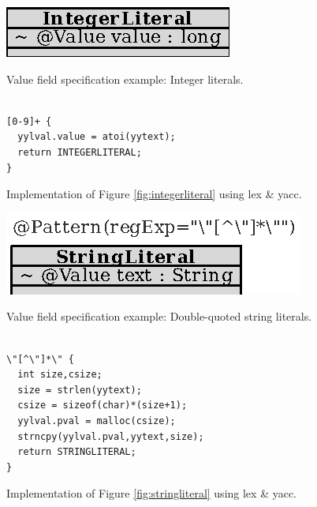 \documentclass[a4paper,twoside,onecolumn]{article}
\begin{document}
\begin{figure}[tb!]
\begin{minipage}{\linewidth}
\centering
\includegraphics[scale=1]{integerliteral.eps}
\caption{Value field specification example: Integer literals.}
 \label{fig:integerliteral}
\end{minipage}


\begin{minipage}{\linewidth}
\begin{center} \begin{minipage}{5cm} \vspace{4mm}
\begin{verbatim}

[0-9]+ {
  yylval.value = atoi(yytext);
  return INTEGERLITERAL;
}
\end{verbatim}
\vspace{-6mm} \end{minipage} \end{center}
\caption{Implementation of Figure \ref{fig:integerliteral} using lex \& yacc.} \label{fig:integerliteralg}
\end{minipage}
\vspace{3mm}

\begin{minipage}{\linewidth}
\centering
\includegraphics[scale=1]{stringliteral.eps}
\caption{Value field specification example: Double-quoted string literals.} \label{fig:stringliteral}
\end{minipage}


\begin{minipage}{\linewidth}
\begin{center} \begin{minipage}{5.2cm} \vspace{4mm}
\begin{verbatim}

\"[^\"]*\" {
  int size,csize;
  size = strlen(yytext);
  csize = sizeof(char)*(size+1);
  yylval.pval = malloc(csize);
  strncpy(yylval.pval,yytext,size);
  return STRINGLITERAL;
}
\end{verbatim}
\vspace{-6mm} \end{minipage} \end{center}
\caption{Implementation of Figure \ref{fig:stringliteral} using lex \& yacc.} \label{fig:stringliteralg}
\end{minipage}

\end{figure}
\end{document}
